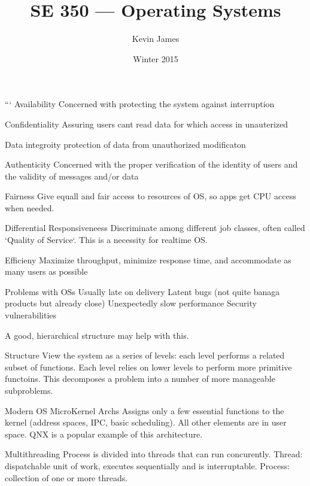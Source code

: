 \documentclass[12pt]{article}
\begin{document}
\title{SE 350 --- Operating Systems}
\author{Kevin James}
\date{\vspace{-2ex}Winter 2015}
\maketitle\HRule

\tableofcontents
\newpage

\section{}

```
Availability
Concerned with protecting the system against interruption

Confidentiality
Assuring users cant read data for which access in unauterized

Data integroity
protection of data from unauthorized modificaton

Authenticity
Concerned with the proper verification of the identity of users and the validity of messages and/or data

Fairness
Give equall and fair access to resources of OS, so apps get CPU access when needed.

Differential Responsiveneess
Discriminate among different job classes, often called `Quality of Service`. This is a necessity for realtime OS.

Efficieny
Maximize throughput, minimize response time, and accommodate as many users as possible

Problems with OSs
Usually late on delivery
Latent bugs (not quite banaga products but already close)
Unexpectedly slow performance
Security vulnerabilities

A good, hierarchical structure may help with this.

Structure
View the system as a series of levels: each level performs a related subset of functions. Each level relies on lower levels to perform more primitive functoins. This decomposes a problem into a number of more manageable subproblems.

Modern OS
MicroKernel Archs
Assigns only a few essential functions to the kernel (address spaces, IPC, basic scheduling). All other elements are in user space. QNX is a popular example of this architecture.

Multithreading
Process is divided into threads that can run concurently. Thread: dispatchable unit of work, executes sequentially and is interruptable. Process: collection of one or more threads.
\end{document}
